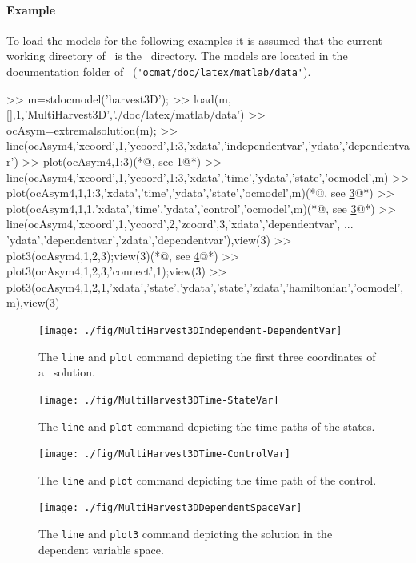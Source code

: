 \paragraph{Example}
To load the models for the following examples it is assumed that the current working directory of \MATL\ is the \OCMAT\ directory. The models are located in the documentation folder of \OCMAT\ (\lstinline+'ocmat/doc/latex/matlab/data'+).
\begin{matlab}
>> m=stdocmodel('harvest3D');
>> load(m,[],1,'MultiHarvest3D','./doc/latex/matlab/data')
>> ocAsym=extremalsolution(m);
>> line(ocAsym{4},'xcoord',1,'ycoord',1:3,'xdata','independentvar','ydata','dependentvar')
>> plot(ocAsym{4},1:3)(*@, see \cref{fig:multipleharvest3Didv}@*)
>> line(ocAsym{4},'xcoord',1,'ycoord',1:3,'xdata','time','ydata','state','ocmodel',m)
>> plot(ocAsym{4},1,1:3,'xdata','time','ydata','state','ocmodel',m)(*@, see \cref{fig:multipleharvest3Dtcv}@*)
>> plot(ocAsym{4},1,1,'xdata','time','ydata','control','ocmodel',m)(*@, see \cref{fig:multipleharvest3Dtcv}@*)
>> line(ocAsym{4},'xcoord',1,'ycoord',2,'zcoord',3,'xdata','dependentvar', ...
         'ydata','dependentvar','zdata','dependentvar'),view(3)
>> plot3(ocAsym{4},1,2,3);view(3)(*@, see \cref{fig:multipleharvest3Ddvs}@*)
>> plot3(ocAsym{4},1,2,3,'connect',1);view(3)
>> plot3(ocAsym{4},1,2,1,'xdata','state','ydata','state','zdata','hamiltonian','ocmodel',m),view(3)
\end{matlab}
\begin{figure}
\centering
\texttt{[image: ./fig/MultiHarvest3DIndependent-DependentVar]}
\caption{The \lstinline+line+ and \lstinline+plot+ command depicting the first three coordinates of a \BVP\ solution.}
\label{fig:multipleharvest3Didv}
\end{figure}
\begin{figure}
\centering
\texttt{[image: ./fig/MultiHarvest3DTime-StateVar]}
\caption{The \lstinline+line+ and \lstinline+plot+ command depicting the time paths of the states.}
\label{fig:multipleharvest3Dtsv}
\end{figure}
\begin{figure}
\centering
\texttt{[image: ./fig/MultiHarvest3DTime-ControlVar]}
\caption{The \lstinline+line+ and \lstinline+plot+ command depicting the time path of the control.}
\label{fig:multipleharvest3Dtcv}
\end{figure}
\begin{figure}
\centering
\texttt{[image: ./fig/MultiHarvest3DDependentSpaceVar]}
\caption{The \lstinline+line+ and \lstinline+plot3+ command depicting the solution in the dependent variable space.}
\label{fig:multipleharvest3Ddvs}
\end{figure}
